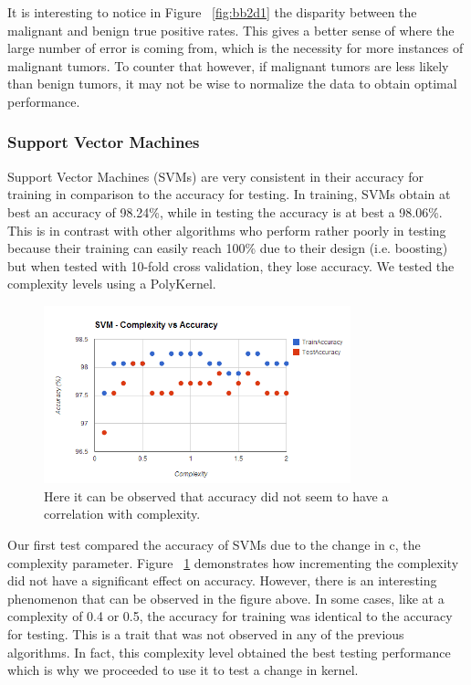 \documentclass[annual]{acmsiggraph}
\begin{document}
It is interesting to notice in Figure ~\ref{fig:bb2d1} the disparity between the malignant and benign true positive rates. 
This gives a better sense of where the large number of error is coming from, which is the necessity for more instances of 
malignant tumors. To counter that however, if malignant tumors are less likely than benign tumors, it may not be wise to
normalize the data to obtain optimal performance.

\subsubsection{Support Vector Machines}

Support Vector Machines (SVMs) are very consistent in their accuracy for training in comparison to the accuracy for testing.
In training, SVMs obtain at best an accuracy of 98.24\%, while in testing the accuracy is at best a 98.06\%. This is in contrast
with other algorithms who perform rather poorly in testing because their training can easily reach 100\% due to their design 
(i.e. boosting) but when tested with 10-fold cross validation, they lose accuracy. We tested the complexity levels using a PolyKernel.

\begin{figure}[ht]
  \centering
  \includegraphics[width=3.5in]{charts/chart_1_svm_d1.png}
  \caption{Here it can be observed that accuracy did not seem to have a correlation with complexity.}
  \label{fig:svm1d1}
\end{figure}

Our first test compared the accuracy of SVMs due to the change in c, the complexity parameter. Figure ~\ref{fig:svm1d1} demonstrates
how incrementing the complexity did not have a significant effect on accuracy. However, there is an interesting phenomenon that can
be observed in the figure above. In some cases, like at a complexity of 0.4 or 0.5, the accuracy for training was identical to the accuracy for testing. This is a trait that was not observed in any of the previous algorithms. In fact, this complexity level 
obtained the best testing performance which is why we proceeded to use it to test a change in kernel.
\end{document}
